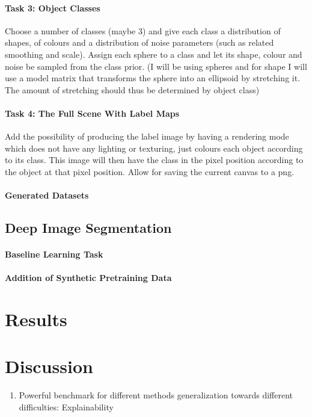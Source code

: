 \documentclass[12pt,fleqn]{article}
\begin{document}
\paragraph{Task 3: Object Classes}
Choose a number of classes (maybe 3) and give each class a distribution of shapes, of colours and a distribution of noise parameters (such as related smoothing and scale). Assign each sphere to a class and let its shape, colour and noise be sampled from the class prior. (I will be using spheres and for shape I will use a model matrix that transforms the sphere into an ellipsoid by stretching it. The amount of stretching should thus be determined by object class)
\paragraph{Task 4: The Full Scene With Label Maps}
Add the possibility of producing the label image by having a rendering mode which does not have any lighting or texturing, just colours each object according to its class. This image will then have the class in the pixel position according to the object at that pixel position. Allow for saving the current canvas to a png.
\paragraph{Generated Datasets}


\subsection{Deep Image Segmentation}
\paragraph{Baseline Learning Task}
\paragraph{Addition of Synthetic Pretraining Data}

\section{Results}%
\label{sec:results}

\section{Discussion}%
\label{sec:disc}
\begin{enumerate}
    \item Powerful benchmark for different methods generalization towards different difficulties: Explainability
\end{enumerate}

\clearpage

\printbibliography[heading=bibintoc]
\end{document}
